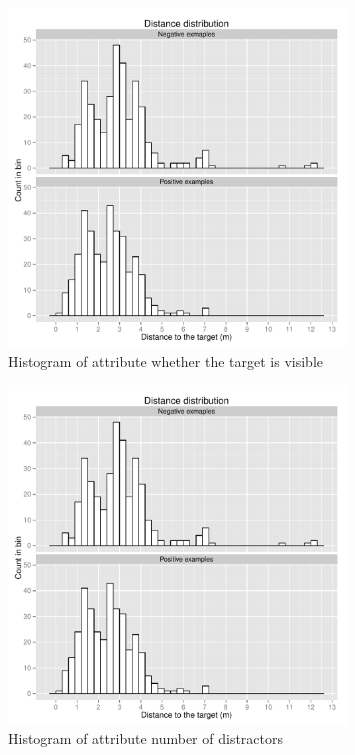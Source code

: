 \begin{figure}[!htbp]
  \centering
	\includegraphics[page=3,width=0.8\textwidth]{Images/fref_distrib}
	\caption{Histogram of attribute whether the target is visible}
	\label{fig:fref-distrib-visib}
\end{figure}

\begin{figure}[!htbp]
  \centering
	\includegraphics[page=4,width=0.8\textwidth]{Images/fref_distrib}
	\caption{Histogram of attribute number of distractors}
	\label{fig:fref-distrib-distractors}
\end{figure}

